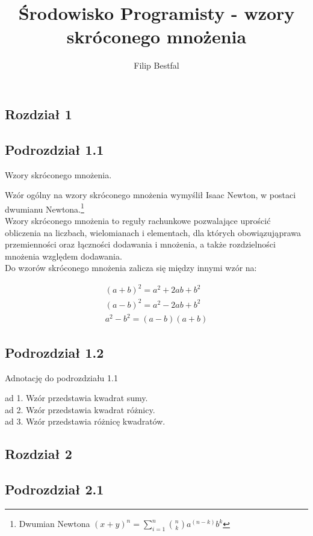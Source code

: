\documentclass[11pt]{article}
\title{Środowisko Programisty - wzory skróconego mnożenia}
\author{Filip Bestfal}
\begin{document}
\maketitle
\newpage
\tableofcontents
\listoffigures
\listoftables
\newpage
\begin{center}
\section{Rozdział 1}
\label{sec:1. teoria}
\subsection{Podrozdział 1.1}
\end{center}
\begin{center}
Wzory skróconego mnożenia.
\end{center}
\begin{flushleft}
Wzór ogólny na wzory skróconego mnożenia wymyślił Isaac Newton, w postaci dwumianu Newtona.\footnote {Dwumian Newtona {${(x+y)^n} = {\sum_{i=1}^{n} }
{n \choose k} {a^{(n-k)}b^k}$}}\\
Wzory skróconego mnożenia to reguły rachunkowe pozwalające uprościć obliczenia na liczbach, wielomianach i elementach, dla których obowiązująprawa przemienności oraz łączności dodawania i mnożenia, a także rozdzielności mnożenia względem dodawania.\\
Do wzorów skróconego mnożenia zalicza się między innymi wzór na:
\end{flushleft}
\begin{flushleft}
\begin{eqnarray}
(a+b)^2 = a^2 + 2ab + b^2\\
(a-b)^2 = a^2 - 2ab + b^2\\
a^2 - b^2 = (a-b)(a+b)
\end{eqnarray}
\end{flushleft}
\begin{center}
\subsection{Podrozdział 1.2}
\end{center}
\begin{center}
Adnotację do podrozdziału 1.1
\end{center}
ad 1. Wzór przedstawia kwadrat sumy.\\
ad 2. Wzór przedstawia kwadrat różnicy.\\
ad 3. Wzór przedstawia różnicę kwadratów.
\newpage
\begin{center}
\section{Rozdział 2}
\subsection{Podrozdział 2.1}
\end{center}
\end{document}
